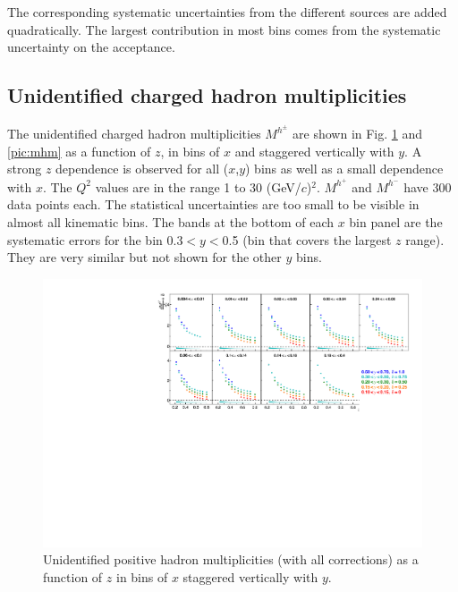 The corresponding systematic uncertainties from the different sources are added quadratically. The largest contribution in most bins comes from the systematic uncertainty on the acceptance.

\subsection{Unidentified charged hadron multiplicities}

The unidentified charged hadron multiplicities $M^{h^{\pm}}$ are shown in Fig. \ref{pic:mhp} and \ref{pic:mhm} as a function of $z$, in bins of $x$ and staggered vertically with $y$. A strong $z$ dependence is observed for all ($x$,$y$) bins as well as a small dependence with $x$. The $Q^2$ values are in the range 1 to 30 (GeV/$c$)$^2$. $M^{h^+}$ and $M^{h^-}$ have 300 data points each. The statistical uncertainties are too small to be visible in almost all kinematic bins. The bands at the bottom of each $x$ bin panel are the systematic errors for the bin 0.3$< y <$0.5 (bin that covers the largest $z$ range). They are very similar but not shown for the other $y$ bins.

\begin{figure}[!h]
  \centering
	\includegraphics[scale=0.85]{./gfx/hp.pdf}
	\caption{Unidentified positive hadron multiplicities (with all corrections) as a function of $z$ in bins of $x$ staggered vertically with $y$.}
	\label{pic:mhp}
\end{figure}

